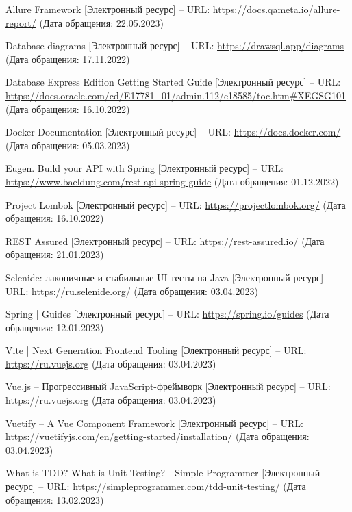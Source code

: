 \documentclass[a4paper,article]{article}
\begin{document}
\begin{sloppypar}
\begin{enumerate}[leftmargin=*, itemindent=\labelwidth]
         Allure Framework [Электронный ресурс] -- URL: \url{https://docs.qameta.io/allure-report/} (Дата обращения: 22.05.2023)
        
         Database diagrams [Электронный ресурс] -- URL: \url{https://drawsql.app/diagrams} (Дата обращения: 17.11.2022)
        
         Database Express Edition Getting Started Guide [Электронный ресурс] -- URL: \url{https://docs.oracle.com/cd/E17781_01/admin.112/e18585/toc.htm#XEGSG101} (Дата обращения: 16.10.2022)
        
         Docker Documentation [Электронный ресурс] -- URL: \url{https://docs.docker.com/} (Дата обращения: 05.03.2023)
        
         Eugen. Build your API with Spring [Электронный ресурс] -- URL: \url{https://www.baeldung.com/rest-api-spring-guide} (Дата обращения: 01.12.2022)
        
         Project Lombok [Электронный ресурс] -- URL: \url{https://projectlombok.org/} (Дата обращения: 16.10.2022)
        
         REST Assured [Электронный ресурс] -- URL: \url{https://rest-assured.io/} (Дата обращения: 21.01.2023)
        
         Selenide: лаконичные и стабильные UI тесты на Java [Электронный ресурс] -- URL: \url{https://ru.selenide.org/} (Дата обращения: 03.04.2023)
        
         Spring | Guides [Электронный ресурс] -- URL: \url{https://spring.io/guides} (Дата обращения: 12.01.2023)
        
         Vite | Next Generation Frontend Tooling [Электронный ресурс] -- URL: \url{https://ru.vuejs.org} (Дата обращения: 03.04.2023)
        
         Vue.js -- Прогрессивный JavaScript-фреймворк [Электронный ресурс] -- URL: \url{https://ru.vuejs.org} (Дата обращения: 03.04.2023)
        
         Vuetify -- A Vue Component Framework [Электронный ресурс] -- URL: \url{https://vuetifyjs.com/en/getting-started/installation/} (Дата обращения: 03.04.2023)
        
         What is TDD? What is Unit Testing? - Simple Programmer [Электронный ресурс] -- URL: \url{https://simpleprogrammer.com/tdd-unit-testing/} (Дата обращения: 13.02.2023)
        

\end{enumerate}
\end{sloppypar}
\end{document}
